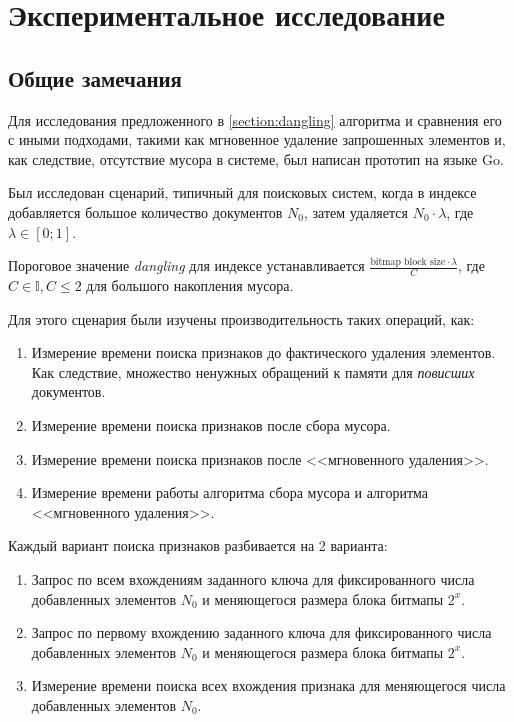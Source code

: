 \newpage
\section{Экспериментальное исследование}

\subsection{Общие замечания}

Для исследования предложенного в \cref{section:dangling} алгоритма и сравнения его с иными
подходами, такими как мгновенное удаление запрошенных элементов и, как следствие, отсутствие
мусора в системе, был написан прототип на языке Go.

Был исследован сценарий, типичный для поисковых систем, когда в индексе добавляется большое
количество документов $N_0$, затем удаляется $N_0\cdot \lambda$, где $\lambda \in [0; 1]$.

Пороговое значение \textit{dangling} для индексе устанавливается
$\frac{\text{bitmap block size} \cdot \lambda}{C}$, где $C \in \mathbb{I}, C \leq 2$ для
большого накопления мусора.

Для этого сценария были изучены производительность таких операций, как:
\begin{enumerate}
    \item Измерение времени поиска признаков до фактического удаления элементов.
    Как следствие, множество ненужных обращений к памяти для \textit{повисших}
    документов.
    \item Измерение времени поиска признаков после сбора мусора.
    \item Измерение времени поиска признаков после <<мгновенного удаления>>.
    \item Измерение времени работы алгоритма сбора мусора и алгоритма <<мгновенного удаления>>.
\end{enumerate}

Каждый вариант поиска признаков разбивается на 2 варианта:
\begin{enumerate}
      \item Запрос по всем вхождениям заданного ключа для фиксированного числа
      добавленных элементов $N_0$ и меняющегося размера блока битмапы $2^{x}$.
      \item Запрос по первому вхождению заданного ключа для фиксированного числа
      добавленных элементов $N_0$ и меняющегося размера блока битмапы $2^{x}$.
      \item Измерение времени поиска всех вхождения признака для меняющегося числа добавленных элементов $N_0$.
\end{enumerate}

